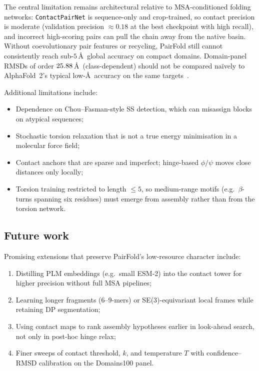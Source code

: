\documentclass[11pt,a4paper]{article}
\begin{document}
The central limitation remains architectural relative to MSA-conditioned folding networks:
\texttt{ContactPairNet} is sequence-only and crop-trained, so contact precision is moderate (validation precision $\approx 0.18$ at the best checkpoint with high recall), and incorrect high-scoring pairs can pull the chain away from the native basin.
Without coevolutionary pair features or recycling, PairFold still cannot consistently reach sub-$5$\,\AA\ global accuracy on compact domains.
Domain-panel RMSDs of order $25.88{}$\,\AA\ (class-dependent) should not be compared na\"ively to AlphaFold~2's typical low-\AA\ accuracy on the same targets~\citep{jumper2021alphafold}.

Additional limitations include:
\begin{itemize}[leftmargin=1.5em]
  \item Dependence on Chou--Fasman-style SS detection, which can misassign blocks on atypical sequences;
  \item Stochastic torsion relaxation that is not a true energy minimisation in a molecular force field;
  \item Contact anchors that are sparse and imperfect; hinge-based $\phi/\psi$ moves close distances only locally;
  \item Torsion training restricted to length $\le 5$, so medium-range motifs (e.g.\ $\beta$-turns spanning six residues) must emerge from assembly rather than from the torsion network.
\end{itemize}

\subsection{Future work}

Promising extensions that preserve PairFold's low-resource character include:
\begin{enumerate}[leftmargin=1.5em]
  \item Distilling PLM embeddings (e.g.\ small ESM-2) into the contact tower for higher precision without full MSA pipelines;
  \item Learning longer fragments ($6$--$9$-mers) or SE(3)-equivariant local frames while retaining DP segmentation;
  \item Using contact maps to rank assembly hypotheses earlier in look-ahead search, not only in post-hoc hinge relax;
  \item Finer sweeps of contact threshold, $k$, and temperature $T$ with confidence--RMSD calibration on the Domains100 panel.
\end{enumerate}
\end{document}
